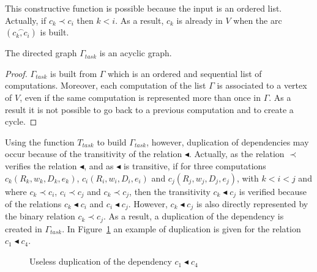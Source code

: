 This constructive function is possible because the input is an ordered list. Actually, if $c_k\prec c_i$ then $k<i$. As a result, $c_k$ is already in $V$ when the arc $(\overset{\frown}{c_k,c_i})$ is built. 

\begin{myprop}
The directed graph $\Gamma_{task}$ is an acyclic graph.
\end{myprop}

\begin{proof}
$\Gamma_{task}$ is built from $\Gamma$ which is an ordered and sequential list of computations. Moreover, each computation of the list $\Gamma$ is associated to a vertex of $V$, even if the same computation is represented more than once in $\Gamma$. As a result it is not possible to go back to a previous computation and to create a cycle.
\end{proof}

Using the function $T_{task}$ to build $\Gamma_{task}$, however, duplication of dependencies may occur because of the transitivity of the relation $\blacktriangleleft$. Actually, as the relation $\prec$ verifies the relation $\blacktriangleleft$, and as $\blacktriangleleft$ is transitive, if for three computations $c_k(R_k,w_k,D_k,e_k)$, $c_i(R_i,w_i,D_i,e_i)$ and $c_j(R_j,w_j,D_j,e_j)$, with $k<i<j$ and where $c_k \prec c_i$, $c_i \prec c_j$ and $c_k \prec c_j$, then the transitivity $c_k \blacktriangleleft c_j$ is verified because of the relations $c_k \blacktriangleleft c_i$ and $c_i \blacktriangleleft c_j$. However, $c_k \blacktriangleleft c_j$ is also directly represented by the binary relation $c_k \prec c_j$. As a result, a duplication of the dependency is created in $\Gamma_{task}$. In Figure~\ref{fig:duplication} an example of duplication is given for the relation $c_1 \blacktriangleleft c_4$.

\begin{figure}[h!]
\begin{center}
  \caption{Useless duplication of the dependency $c_1 \blacktriangleleft c_4$}
  \label{fig:duplication}
\end{center}
\end{figure}

